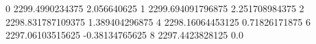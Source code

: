0 2299.4990234375 2.056640625
1 2299.694091796875 2.251708984375
2 2298.831787109375 1.389404296875
4 2298.16064453125 0.71826171875
6 2297.06103515625 -0.38134765625
8 2297.4423828125 0.0

